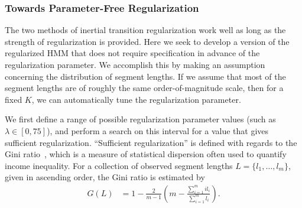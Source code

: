 \documentclass[letterpaper]{article}
\begin{document}
%
%

\subsubsection{Towards Parameter-Free Regularization}\label{sec:param-free}

The two methods of inertial transition regularization work well as long as the strength of regularization is provided. Here we seek to develop a version of the regularized HMM that does not require specification in advance of the regularization parameter. We accomplish this by making an assumption concerning the distribution of segment lengths. If we assume that most of the segment lengths are of roughly the same order-of-magnitude scale, then for a fixed $K$, we can automatically tune the regularization parameter.

We first define a range of possible regularization parameter values (such as $\lambda \in [0, 75]$), and perform a search on this interval for a value that gives sufficient regularization. ``Sufficient regularization'' is defined with regards to the Gini ratio~\cite{gini1936,wiki:1}, which is a measure of statistical dispersion often used to quantify income inequality. For a collection of observed segment lengths $L = \{l_1, \ldots, l_m\}$, given in ascending order, the Gini ratio is estimated by
\begin{align*}
    G(L) &= 1 - \frac{2}{m-1}\left(m - \frac{\sum_{i=1}^{m} i l_i}{\sum_{i=1}^{m} l_i}\right).
\end{align*}
\end{document}
